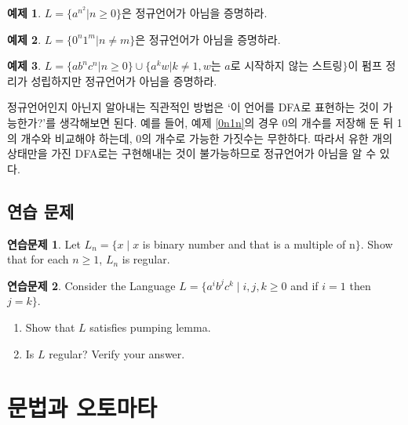 \documentclass[b5paper]{book}
\theoremstyle{definition}
\newtheorem{ex}{예제}[chapter]
\newtheorem{ec}{연습문제}[chapter]
\begin{document}
\begin{ex}
    $L = \{a^{n^2} \vert n \ge 0\}$은 정규언어가 아님을 증명하라.
\end{ex}
\begin{ex}
     $L = \{0^n 1^m \vert n \neq m\}$은 정규언어가 아님을 증명하라.
\end{ex}
\begin{ex} 
    $L = \{ab^nc^n \vert n \ge 0\} \cup 
\{ a^k w \vert k \neq 1, w\text{는 } a\text{로 시작하지 않는 스트링} \}$이 펌프 정리가 성립하지만
정규언어가 아님을 증명하라.
\end{ex}
정규언어인지 아닌지 알아내는 직관적인 방법은 `이 언어를 DFA로 표현하는 것이 가능한가?'를
생각해보면 된다. 예를 들어, 예제 \ref{0n1n}의 경우 0의 개수를 저장해 둔 뒤 1의 개수와 비교해야 하는데,
0의 개수로 가능한 가짓수는 무한하다. 따라서 유한 개의 상태만을 가진 DFA로는 구현해내는 것이
불가능하므로 정규언어가 아님을 알 수 있다. 

\section{연습 문제}
\begin{ec}
    Let $L_n = \{x \;\vert\; x$ is binary number and that is a multiple 
    of n$\}$. Show that for each $n\ge 1$, $L_n$ is regular. 
\end{ec}
\begin{ec}
    Consider the Language $L= \{a^i b^j c^k \;\vert\; i, j, k \ge 0$ 
    and if $i = 1$ then $j=k\}$.
    \begin{enumerate}
        \item Show that $L$ satisfies pumping lemma.
        \item Is $L$ regular? Verify your answer.
    \end{enumerate}
\end{ec}
\chapter{문법과 오토마타} 
\end{document}
